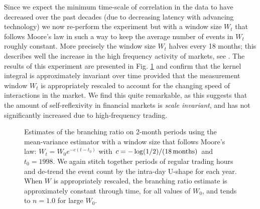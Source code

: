 \documentclass{article}
\newcommand{\tmtextit}[1]{{\itshape{#1}}}
\begin{document}
Since we expect the minimum time-scale of correlation in the data to have
decreased over the past decades (due to decreasing latency with advancing
technology) we now re-perform the experiment but with a window size $W_t$ that
follows Moore's law in such a way to keep the average number of events in
$W_t$ roughly constant. More precisely the window size $W_t$ halves every 18
months; this describes well the increase in the high frequency activity of
markets, see {\cite{criticalreflexivity}}. The results of this experiment are
presented in Fig. \ref{fig:varying} and confirm that the kernel integral is
approximately invariant over time provided that the measurement window $W_t$
is appropriately rescaled to account for the changing speed of interactions in
the market. We find this quite remarkable, as this suggests that the amount of
self-reflexivity in financial markets is \tmtextit{scale invariant}, and has
not significantly increased due to high-frequency trading.

\begin{figure}[h]
  \caption{\label{fig:varying} Estimates of the branching ratio on 2-month
  periods using the mean-variance estimator with a window size that follows
  Moore's law: $W_t = W_0 e^{- c (t - t_0)}$ with $c = - \log (1 / 2) / (18
  \hspace{0.17em} \mathrm{months})$ and $t_0 = 1998$. We again stitch together
  periods of regular trading hours and de-trend the event count by the
  intra-day U-shape for each year. When $W$ is appropriately rescaled, the
  branching ratio estimate is approximately constant through time, for all
  values of $W_0$, and tends to $n = 1.0$ for large $W_0$.}
\end{figure}
\end{document}
